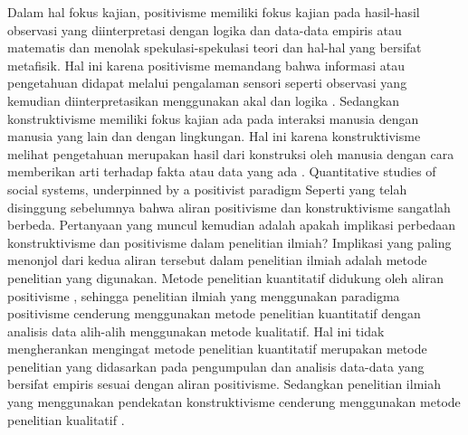 \begin{solution}
	Dalam hal fokus kajian, positivisme memiliki fokus kajian pada hasil-hasil observasi yang diinterpretasi dengan logika dan data-data empiris atau matematis dan menolak spekulasi-spekulasi teori dan hal-hal yang bersifat metafisik.
	Hal ini karena positivisme memandang bahwa informasi atau pengetahuan didapat melalui pengalaman sensori seperti observasi yang kemudian diinterpretasikan menggunakan akal dan logika \cite{macionis_sociology_2011}.
	Sedangkan konstruktivisme memiliki fokus kajian ada pada interaksi manusia dengan manusia yang lain dan dengan lingkungan.
	Hal ini karena konstruktivisme melihat pengetahuan merupakan hasil dari konstruksi oleh manusia dengan cara memberikan arti terhadap fakta atau data yang ada \cite{hinchey_chapter_2010}.
	Quantitative studies of social systems, underpinned by a positivist paradigm
	Seperti yang telah disinggung sebelumnya bahwa aliran positivisme dan konstruktivisme sangatlah berbeda.
	Pertanyaan yang muncul kemudian adalah apakah implikasi perbedaan konstruktivisme dan positivisme dalam penelitian ilmiah?
	Implikasi yang paling menonjol dari kedua aliran tersebut dalam penelitian ilmiah adalah metode penelitian yang digunakan.
	Metode penelitian kuantitatif didukung oleh aliran positivisme \cite{armstrong_positivism_2013}, sehingga penelitian ilmiah yang menggunakan paradigma positivisme cenderung menggunakan metode penelitian kuantitatif dengan analisis data alih-alih menggunakan metode kualitatif.
	Hal ini tidak mengherankan mengingat metode penelitian kuantitatif merupakan metode penelitian yang didasarkan pada pengumpulan dan analisis data-data yang bersifat empiris sesuai dengan aliran positivisme.
	Sedangkan penelitian ilmiah yang menggunakan pendekatan konstruktivisme cenderung menggunakan metode penelitian kualitatif \cite{mertens_research_2015}.
\end{solution}